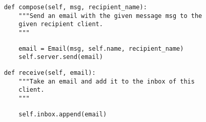 \begin{lstlisting}
    def compose(self, msg, recipient_name):
        """Send an email with the given message msg to the
        given recipient client.
        """
\end{lstlisting}
\begin{solution}[1in]
\begin{lstlisting}
        email = Email(msg, self.name, recipient_name)
        self.server.send(email)
\end{lstlisting}
\end{solution}

\begin{lstlisting}
    def receive(self, email):
        """Take an email and add it to the inbox of this
        client.
        """
\end{lstlisting}
\begin{solution}[1in]
\begin{lstlisting}
        self.inbox.append(email)
\end{lstlisting}
\end{solution}

\clearpage
